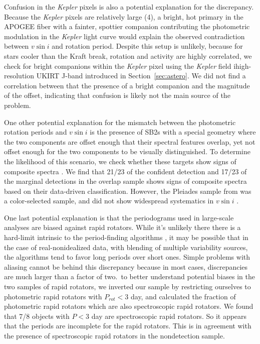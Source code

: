 \documentclass[manuscript]{aastex6}
\newcommand{\vsini}{\ensuremath{v \sin i}}
\newcommand{\Kepler}{\mbox{\textit{Kepler}}}
\begin{document}
Confusion in the \Kepler{} pixels is also a potential explanation for the
discrepancy. Because the \Kepler{} pixels are relatively large (4\arcsec), a 
bright, hot primary in the APOGEE fiber with a fainter, spottier companion 
contributing the photometric modulation in the
\Kepler{} light curve would explain the observed contradiction between
\vsini{} and rotation period. Despite this setup is unlikely, because for 
stars cooler than the Kraft break, rotation and activity are highly 
correlated, we check for bright companions
within the \Kepler{} pixel using the \Kepler{} field ihigh-resolution UKIRT
J-band introduced in Section~\ref{sec:astero}. We did not find a correlation 
between that the presence of a bright companion and the magnitude of the 
offset, indicating that confusion is likely not the main source of the 
problem.

One other potential explanation for the mismatch between the photometric
rotation periods and \vsini{} is the presence of SB2s with a special geometry
where the two components are offset enough that their spectral features
overlap, yet not offset enough for the two components to be visually
distinguished.  To determine the likelihood of this scenario, we check whether
these targets show signs of composite spectra \citep{ElBadry18}. We 
find that 21/23 of the confident detection and 17/23 of the marginal detections
in the overlap sample shows signs of composite spectra based on their
data-driven classification. However, the Pleiades sample from
\citet{Stauffer87} was a color-selected sample, and did not show widespread
systematics in \vsini{} \citep{Jackson10}.

One last potential explanation is that the periodograms used in large-scale
analyses are biased against rapid rotators. While it's unlikely there there is
a hard-limit intrinsic to the period-finding algorithms \citep{Aigrain15}, it
may be possible that in the case of real-nonidealized data, with blending of
multiple variability sources, the algorithms tend to favor long periods over
short ones. Simple problems with aliasing cannot be behind this discrepancy
because in most cases, discrepancies are much larger than a factor of two.\ to
better understand potential biases in the two samples of rapid rotators, we
inverted our sample by restricting ourselves to photometric rapid rotators with
\(P_{rot} < 3\) day, and calculated the fraction of photometric rapid rotators
which are also spectroscopic rapid rotators. We found that 7/8 objects
with \(P < 3\) day are spectroscopic rapid rotators. So it appears that the
\citet{McQuillan14} periods are incomplete for the rapid rotators. This is in
agreement with the presence of spectroscopic rapid rotators in the
\citet{McQuillan14} nondetection sample.
\end{document}
